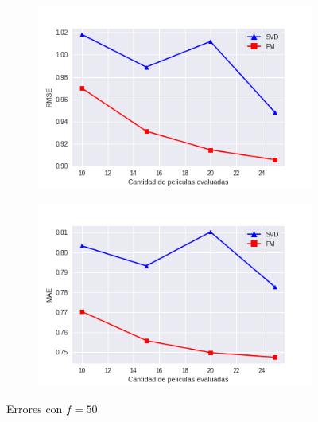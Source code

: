 \documentclass[hidelinks,12pt,a4paper]{book}
\theoremstyle{plain}
\theoremstyle{definition}
\begin{document}
\begin{figure}[!ht]
\centering
    \begin{subfigure}[b]{0.5\textwidth}            
            \includegraphics[width=\textwidth]{graficos/entr-50-rmse.png}
    \end{subfigure}%
    \begin{subfigure}[b]{0.5\textwidth}
            \centering
            \includegraphics[width=\textwidth]{graficos/entr-50-mae.png}
    \end{subfigure}
    \caption{Errores con $f=50$}\label{fig:entr3}
\end{figure}
\end{document}
